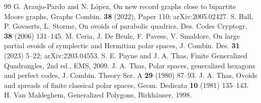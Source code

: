 \documentclass[11pt]{amsart}
\theoremstyle{definition}
\theoremstyle{remark}
\begin{document}
\begin{thebibliography}{99}
 G. Araujo-Pardo and N. L\'opez, On new record graphs close to bipartite Moore graphs, Graphs Combin.
\textbf{38} (2022), Paper 110; arXiv:2005.02427.
 S. Ball, P. Govaerts, L. Storme, On ovoids of parabolic quadrics, Des. Codes Cryptogr. \textbf{38}
(2006) 131--145.
 M. Ceria, J. De Beule, F. Pavese, V. Smaldore, On large partial ovoids of symplectic and Hermitian
polar spaces, J. Combin. Des. \textbf{31} (2023) 5--22; arXiv:2203.04553.
 S. E. Payne and J. A. Thas, Finite Generalized Quadrangles, 2nd ed., EMS, 2009.
 J. A. Thas, Polar spaces, generalized hexagons and perfect codes, J. Combin. Theory Ser. A \textbf{29}
(1980) 87--93.
 J. A. Thas, Ovoids and spreads of finite classical polar spaces, Geom. Dedicata \textbf{10} (1981)
135--143.
 H. Van Maldeghem, Generalized Polygons, Birkh\"auser, 1998.
\end{thebibliography}
\end{document}
